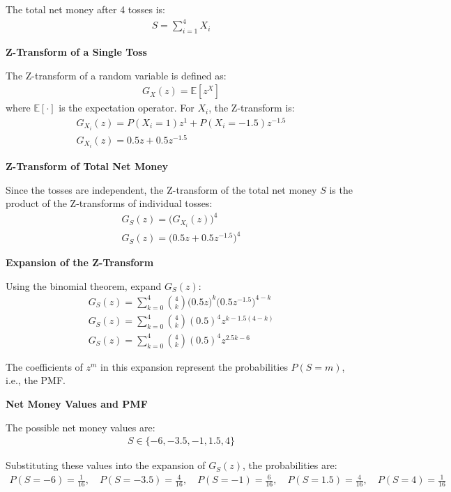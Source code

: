 \documentclass[journal]{IEEEtran}
\numberwithin{equation}{enumi}
\numberwithin{figure}{enumi}
\begin{document}
The total net money after 4 tosses is:
\begin{align}
S = \sum_{i=1}^4 X_i
\end{align}

\textbf{Z-Transform of a Single Toss}

The Z-transform of a random variable is defined as:
\begin{align}
G_X(z) = \mathbb{E}[z^X]
\end{align}
where $\mathbb{E}[\cdot]$ is the expectation operator. For $X_i$, the Z-transform is:
\begin{align}
G_{X_i}(z) = P(X_i = 1)z^1 + P(X_i = -1.5)z^{-1.5}\\
G_{X_i}(z) = 0.5z + 0.5z^{-1.5}
\end{align}

\textbf{Z-Transform of Total Net Money}

Since the tosses are independent, the Z-transform of the total net money $S$ is the product of the Z-transforms of individual tosses:
\begin{align}
G_S(z) = \big(G_{X_i}(z)\big)^4 \\
G_S(z) = \big(0.5z + 0.5z^{-1.5}\big)^4
\end{align}

\textbf{Expansion of the Z-Transform}

Using the binomial theorem, expand $G_S(z)$:
\begin{align}
G_S(z) = \sum_{k=0}^4 \binom{4}{k} \big(0.5z\big)^k \big(0.5z^{-1.5}\big)^{4-k} \\
G_S(z) = \sum_{k=0}^4 \binom{4}{k} (0.5)^4 z^{k - 1.5(4-k)} \\
G_S(z) = \sum_{k=0}^4 \binom{4}{k} (0.5)^4 z^{2.5k - 6}
\end{align}

The coefficients of $z^m$ in this expansion represent the probabilities $P(S = m)$, i.e., the PMF.

\textbf{Net Money Values and PMF}

The possible net money values are:
\begin{align}
S \in \{-6, -3.5, -1, 1.5, 4\}
\end{align}

Substituting these values into the expansion of $G_S(z)$, the probabilities are:
\begin{align}
P(S = -6) = \frac{1}{16}, \quad P(S = -3.5) = \frac{4}{16}, \quad P(S = -1) = \frac{6}{16}, \quad P(S = 1.5) = \frac{4}{16}, \quad P(S = 4) = \frac{1}{16}
\end{align}
\end{document}
